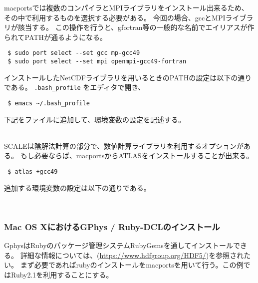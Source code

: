 macportsでは複数のコンパイラとMPIライブラリをインストール出来るため、
その中で利用するものを選択する必要がある。
今回の場合、gccとMPIライブラリが該当する。
この操作を行うと、gfortran等の一般的な名前でエイリアスが作られてPATHが通るようになる。
\begin{verbatim}
 $ sudo port select --set gcc mp-gcc49
 $ sudo port select --set mpi openmpi-gcc49-fortran
\end{verbatim}

インストールしたNetCDFライブラリを用いるときのPATHの設定は以下の通りである。
\verb|.bash_profile| をエディタで開き、
\begin{verbatim}
 $ emacs ~/.bash_profile
\end{verbatim}
下記をファイルに追加して、環境変数の設定を記述する。

\\

SCALEは陰解法計算の部分で、数値計算ライブラリを利用するオプションがある。
もし必要ならば、macportsからATLASをインストールすることが出来る。
\begin{verbatim}
 $ atlas +gcc49
\end{verbatim}

追加する環境変数の設定は以下の通りである。

\\

\subsubsection{Mac OS XにおけるGPhys / Ruby-DCLのインストール}

GphysはRubyのパッケージ管理システムRubyGemsを通してインストールできる。
詳細な情報については、(\url{https://www.hdfgroup.org/HDF5/})を参照されたい。
まず必要であればrubyのインストールをmacportsを用いて行う。この例ではRuby2.1を利用することにする。

